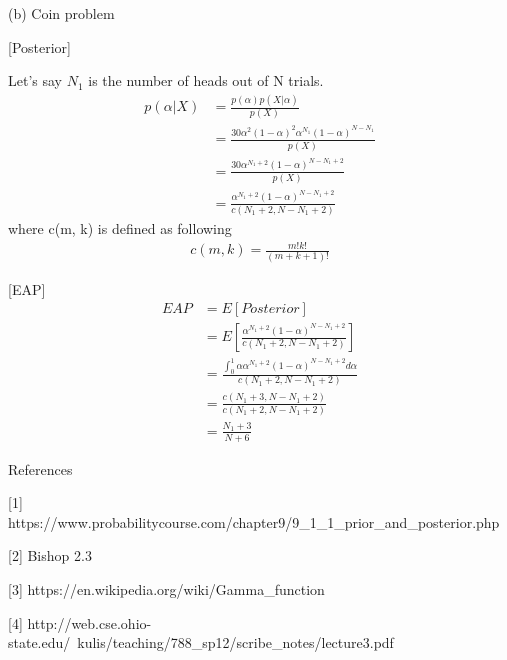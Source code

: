 \documentclass[11pt]{article}
\theoremstyle{definition}
\begin{document}
(b) Coin problem

[Posterior]

Let's say $N_1$ is the number of heads out of N trials.
\begin{equation*}
\begin{split}
 p(\alpha | X ) & =  \frac{p(\alpha)p(X|\alpha)}{p(X)}  \\
& = \frac{30\alpha^2(1-\alpha)^2\alpha^{N_1} (1-\alpha)^{N-{N_1}}}{p(X)}  \\
& = \frac{30\alpha^{N_1+2} (1-\alpha)^{N-{N_1}+2}}{p(X)}  \\
& = \frac{\alpha^{N_1+2} (1-\alpha)^{N-{N_1}+2}}{c(N_1 +2, N - N_1 +2)} 
\end{split}
\end{equation*}
where c(m, k) is defined as following
\begin{equation*}
\begin{split}
c(m, k) = \frac{m!k!}{(m+k+1)!} 
\end{split}
\end{equation*}

[EAP]
\begin{equation*}
\begin{split}
EAP & = E[Posterior]  \\
& = E[\frac{\alpha^{N_1+2} (1-\alpha)^{N-{N_1}+2}}{c(N_1 +2, N - N_1 +2)}]  \\
& = \frac{\int_{0}^{1}\alpha \alpha^{N_1+2} (1-\alpha)^{N-{N_1}+2} d\alpha}{c(N_1 +2, N - N_1 +2)}  \\
& = \frac{c(N_1 +3, N - N_1 +2)}{c(N_1 +2, N - N_1 +2)}  \\
& = \frac{N_1 + 3}{N + 6}
\end{split}
\end{equation*}

References

[1] https://www.probabilitycourse.com/chapter9/9_1_1_prior_and_posterior.php

[2] Bishop 2.3

[3] https://en.wikipedia.org/wiki/Gamma_function

[4] http://web.cse.ohio-state.edu/~kulis/teaching/788_sp12/scribe_notes/lecture3.pdf
\end{document}
